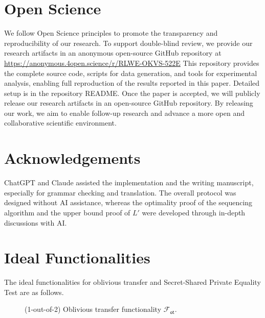 \section*{Open Science}
We follow Open Science principles to promote the transparency and reproducibility of our research. 
To support double-blind review, we provide our research artifacts in an anonymous open-source GitHub repository at \url{https://anonymous.4open.science/r/RLWE-OKVS-522E} 
This repository provides the complete source code, scripts for data generation, and tools for experimental analysis, enabling full reproduction of the results reported in this paper. Detailed setup is in the repository README. Once the paper is accepted, we will publicly release our research artifacts in an open-source GitHub repository. By releasing our work, we aim to enable follow-up research and advance a more open and collaborative scientific environment.


\section*{Acknowledgements}
ChatGPT and Claude assisted the implementation and the writing manuscript, especially for grammar checking and translation.
The overall protocol was designed without AI assistance, whereas the optimality proof of the sequencing algorithm and the upper bound proof of $L'$ were developed through in-depth discussions with AI.




\section{Ideal Functionalities}\label{sec:Funtionality}
The ideal functionalities for oblivious transfer and Secret-Shared Private Equality Test are as follows.


\begin{figure}[htbp]
\centering
{}
\caption{(1-out-of-2) Oblivious transfer functionality $\mathcal{F}_{\mathsf{ot}}$.}\label{fig:ot}
\end{figure}

